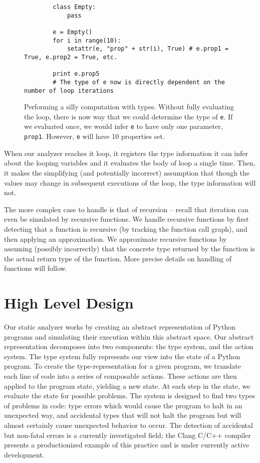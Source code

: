 \documentclass{article}[12pt]
\begin{document}
\begin{figure}
    \begin{verbatim}
        class Empty:
            pass

        e = Empty()
        for i in range(10):
            setattr(e, "prop" + str(i), True) # e.prop1 = True, e.prop2 = True, etc.

        print e.prop5
        # The type of e now is directly dependent on the number of loop iterations
    \end{verbatim}
    \caption{Performing a silly computation with types. Without fully evaluating the loop, there is now
        way that we could determine the type of \texttt{e}. If we evaluated once, we would infer
        \texttt{e} to have only one parameter, \texttt{prop1}. However, \texttt{e} will have 10
        properties set.  
     } 
     \label{fig:cantignoreloops}
 \end{figure}
When our analyzer reaches it loop, it registers the type information it can infer about the looping
variables and it evaluates the body of loop a single time. Then, it makes the simplifying (and
potentially incorrect) assumption that though the values may change in subsequent executions of the
loop, the type information will not.

The more complex case to handle is that of recursion -- recall that iteration can even be simulated
by recursive functions. We handle recursive functions by first detecting that a function is
recursive (by tracking the function call graph), and then applying an approximation. We approximate
recursive functions by assuming (possibly incorrectly) that the concrete type returned by the
function is the actual return type of the function. More precise details on handling of functions
will follow.

\section{High Level Design} Our static analyzer works by creating an abstract representation of
Python programs and simulating their execution within this abstract space. Our abstract
representation decomposes into two components: the type system, and the action system. The type
system fully represents our view into the state of a Python program. To create the
type-representation for a given program, we translate each line of code into a series of composable
actions.  These actions are then applied to the program state, yielding a new state. At each step in
the state, we evaluate the state for possible problems. The system is
designed to find two types of problems in code: type errors which would cause the program to halt in
an unexpected way, and accidental types that will not halt the program but will almost certainly
cause unexpected behavior to occur. The detection of accidental but non-fatal errors is a currently
investigated field; the Clang C/C++ compiler presents a productionized example of this practice and
is under currently active development.
\end{document}
